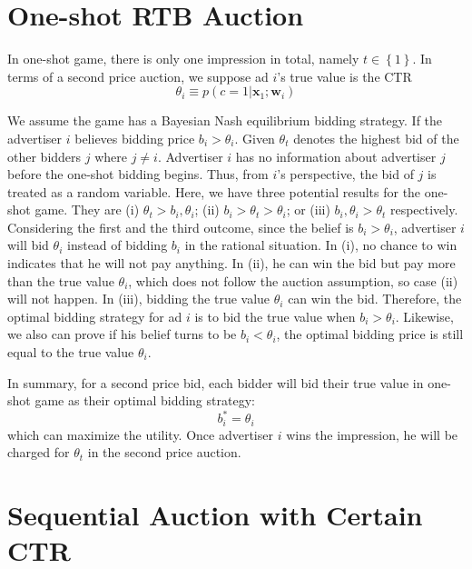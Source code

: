 \section{One-shot RTB Auction}

In one-shot game, there is only one impression in total, namely $t \in \left \{ 1 \right \}$. In terms of a second price auction, we suppose ad $i$'s true value is the CTR
\begin{equation}
\theta_i\equiv p(c=1|\mathbf{x}_1;\mathbf{w}_i)
\end{equation}

We assume the game has a Bayesian Nash equilibrium bidding strategy. If the advertiser $i$ believes bidding price $b_i>\theta_i$. Given $\theta_t$ denotes the highest bid of the other bidders $j$ where $j\neq i$. Advertiser $i$ has no information about advertiser $j$ before the one-shot bidding begins. Thus, from $i$'s perspective, the bid of $j$ is treated as a random variable. Here, we have three potential results for the one-shot game. They are (i) $\theta_t>b_i,\theta_i$; (ii) $b_i>\theta_t>\theta_i$; or (iii) $b_i,\theta_i>\theta_t$ respectively. Considering the first and the third outcome, since the belief is $b_i>\theta_i$, advertiser $i$ will bid $\theta_i$ instead of bidding $b_i$ in the rational situation. In (i), no chance to win indicates that he will not pay anything. In (ii), he can win the bid but pay more than the true value $\theta_i$, which does not follow the auction assumption, so case (ii) will not happen. In (iii), bidding the true value $\theta_i$ can win the bid. Therefore, the optimal bidding strategy for ad $i$ is to bid the true value when $b_i>\theta_i$. Likewise, we also can prove if his belief turns to be $b_i<\theta_i$, the optimal bidding price is still equal to the true value $\theta_i$.

In summary, for a second price bid, each bidder will bid their true value in one-shot game as their optimal bidding strategy:
\begin{equation}
\label{eq:bidding true value}
b_{i}^{*}=\theta_i
\end{equation}
which can maximize the utility. Once advertiser $i$ wins the impression, he will be charged for $\theta_t$ in the second price auction.

\section{Sequential Auction with Certain CTR}

